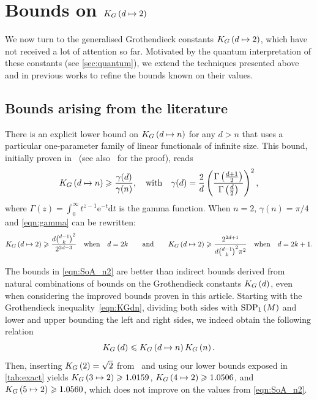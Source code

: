 \documentclass[10pt,aps,notitlepage,onecolumn,pra,superscriptaddress]{revtex4-1}
\renewcommand{\leq}{\leqslant}
\renewcommand{\geq}{\geqslant}
\newcommand{\bd}{\mathrm{d}}
\newcommand{\be}{\mathrm{e}}
\newcommand\KG[2]{K_G\left({#1}\ifx#2\empty\else\mapsto\fi{#2}\right)}
\newcommand\sdp[2]{\mathrm{SDP}_{#1}\ifx#2\empty\else\left({#2}\right)\fi}
\begin{document}
\section{Bounds on \texorpdfstring{$\KG{d}{2}$}{KG(d->2)}}
\label{sec:KGd2}

We now turn to the generalised Grothendieck constants $\KG{d}{2}$, which have not received a lot of attention so far.
Motivated by the quantum interpretation of these constants (see \cref{sec:quantum}), we extend the techniques presented above and in previous works to refine the bounds known on their values.

\subsection{Bounds arising from the literature}

There is an explicit lower bound on $\KG{d}{n}$ for any $d>n$ that uses a particular one-parameter family of linear functionals of infinite size.
This bound, initially proven in~\cite{VP09,BBT11} (see also~\cite[Theorem~3.3.1]{Bri11} for the proof), reads
\begin{equation}
  \KG{d}{n}\geq\frac{\gamma(d)}{\gamma(n)},\quad\text{with}\quad\gamma(d)=\frac{2}{d}\left(\frac{\Gamma\left(\frac{d+1}{2}\right)}{\Gamma\left(\frac{d}{2}\right)}\right)^2,
  \label{eqn:gamma}
\end{equation}
where $\Gamma(z)=\int_0^\infty t^{z-1}\be^{-t}\bd t$ is the gamma function.
When $n=2$, $\gamma(n)=\pi/4$ and \cref{eqn:gamma} can be rewritten:
\begin{equation}
  \KG{d}{2}\geq\frac{d\binom{d-1}{k}^2}{2^{2d-3}}\quad\text{when}\quad d=2k\qquad\text{and}\qquad\KG{d}{2}\geq\frac{2^{2d+1}}{d\binom{d-1}{k}^2\pi^2}\quad\text{when}\quad d=2k+1.
  \label{eqn:SoA_n2}
\end{equation}

The bounds in \cref{eqn:SoA_n2} are better than indirect bounds derived from natural combinations of bounds on the Grothendieck constants $\KG{d}{}$, even when considering the improved bounds proven in this article.
Starting with the Grothendieck inequality~\eqref{eqn:KGdn}, dividing both sides with $\sdp{1}{M}$ and lower and upper bounding the left and right sides, we indeed obtain the following relation
\begin{equation}
  \KG{d}{}\leq \KG{d}{n}\KG{n}{}.
  \label{eqn:multip}
\end{equation}
Then, inserting $\KG{2}{}=\sqrt2$ from~\cite{Kri79} and using our lower bounds exposed in \cref{tab:exact} yields $\KG{3}{2}\geq1.0159$, $\KG{4}{2}\geq1.0506$, and $\KG{5}{2}\geq1.0560$, which does not improve on the values from \cref{eqn:SoA_n2}.
\end{document}
